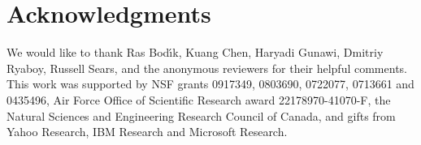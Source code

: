 \section*{Acknowledgments}
We would like to thank Ras Bod\'{\i}k, Kuang Chen, Haryadi Gunawi, Dmitriy
Ryaboy, Russell Sears, and the anonymous reviewers for their helpful
comments. This work was supported by NSF grants 0917349, 0803690, 0722077,
0713661 and 0435496, Air Force Office of Scientific Research award
22178970-41070-F, the Natural Sciences and Engineering Research Council of
Canada, and gifts from Yahoo Research, IBM Research and Microsoft Research.

